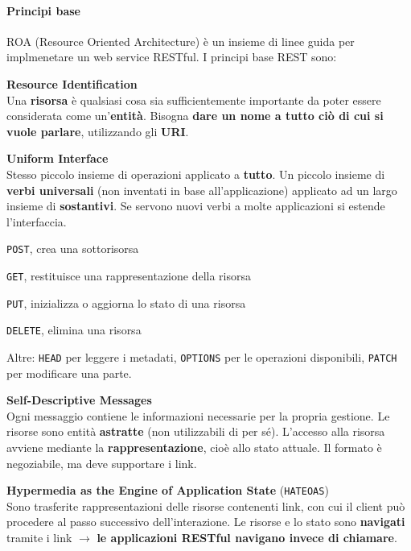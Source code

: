 \documentclass[10pt]{article}
\begin{document}
\paragraph{Principi base} ROA (Resource Oriented Architecture) è un insieme di linee guida per implmenetare un web service RESTful. I principi base REST sono:
\begin{list}{}{}
	\item \textbf{Resource Identification}\\
	Una \textbf{risorsa} è qualsiasi cosa sia sufficientemente importante da poter essere considerata come un'\textbf{entità}. Bisogna \textbf{dare un nome a tutto ciò di cui si vuole parlare}, utilizzando gli \textbf{URI}.
	\item \textbf{Uniform Interface}\\
	Stesso piccolo insieme di operazioni applicato a \textbf{tutto}. Un piccolo insieme di \textbf{verbi universali} (non inventati in base all'applicazione) applicato ad un largo insieme di \textbf{sostantivi}. Se servono nuovi verbi a molte applicazioni si estende l'interfaccia. \begin{list}{}{}
		\item \texttt{POST}, crea una sottorisorsa
		\item \texttt{GET}, restituisce una rappresentazione della risorsa
		\item \texttt{PUT}, inizializza o aggiorna lo stato di una risorsa
		\item \texttt{DELETE}, elimina una risorsa
		\item Altre: \texttt{HEAD} per leggere i metadati, \texttt{OPTIONS} per le operazioni disponibili, \texttt{PATCH} per modificare una parte.
	\end{list}
	\item \textbf{Self-Descriptive Messages}\\
	Ogni messaggio contiene le informazioni necessarie per la propria gestione. Le risorse sono entità \textbf{astratte} (non utilizzabili di per sé). L'accesso alla risorsa avviene mediante la \textbf{rappresentazione}, cioè allo stato attuale. Il formato è negoziabile, ma deve supportare i link.
	\item \textbf{Hypermedia as the Engine of Application State} (\texttt{HATEOAS})\\
	Sono trasferite rappresentazioni delle risorse contenenti link, con cui il client può procedere al passo successivo dell'interazione. Le risorse e lo stato sono \textbf{navigati} tramite i link $\rightarrow$ \textbf{le applicazioni RESTful navigano invece di chiamare}.

\end{list}
\end{document}
